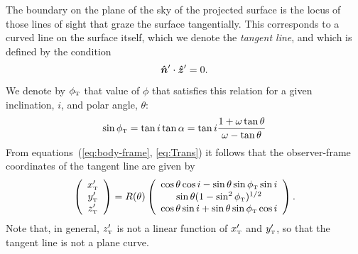 
The boundary on the plane of the sky of the projected surface is the
locus of those lines of sight that graze the surface tangentially.
This corresponds to a curved line on the surface itself, which we
denote the \textit{tangent line}, and which is defined by the
condition 
\begin{equation}
  \label{eq:tangent-line-condition}
  \bm{\hat{n}}'\cdot \bm{\hat{z}}' = 0.
\end{equation}
We denote by \(\phi_{\mathrm{\scriptscriptstyle T}}\) that value of $\phi$ that satisfies this
relation for a given inclination, \(i\), and polar angle, \(\theta\):
\begin{equation}
\sin\phi_{\mathrm{\scriptscriptstyle T}} = \tan i\tan\alpha = \tan i \frac{1+\omega\tan\theta}{\omega-\tan\theta}
\label{eq:tanphi}
\end{equation}
From equations~(\ref{eq:body-frame}, \ref{eq:Trans}) it follows that
the observer-frame coordinates of the tangent line are given by
\begin{equation}
\left(\begin{array}{c}
x'_{\mathrm{\scriptscriptstyle T}} \\ y'_{\mathrm{\scriptscriptstyle T}} \\ z'_{\mathrm{\scriptscriptstyle T}}
\end{array}\right)= R(\theta)\left(\begin{array}{c}
\cos\theta\cos i - \sin\theta\sin\phi_{\mathrm{\scriptscriptstyle T}} \sin i \\
\sin\theta(1-\sin^2\phi_{\mathrm{\scriptscriptstyle T}})^{1/2} \\
\cos\theta\sin i +\sin\theta\sin\phi_{\mathrm{\scriptscriptstyle T}}\cos i
\end{array}\right).
\label{eq:tangential}
\end{equation} 
Note that, in general, \(z'_{\mathrm{\scriptscriptstyle T}}\) is not a linear function of \(x'_{\mathrm{\scriptscriptstyle T}}\)
and \(y'_{\mathrm{\scriptscriptstyle T}}\), so that the tangent line is not a plane curve. 

